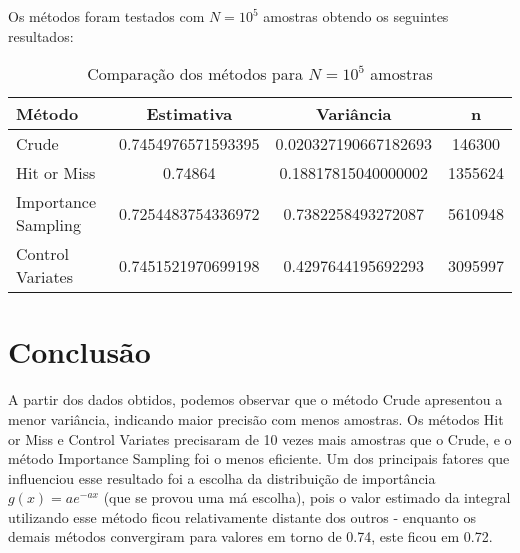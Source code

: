 \documentclass[12pt, a4paper]{article}
\begin{document}
Os métodos foram testados com \( N = 10^5 \) amostras obtendo os seguintes resultados:

\begin{table}[h]
\centering
\caption{Comparação dos métodos para \(N = 10^5\) amostras}
\begin{tabular}{|l|c|c|c|}
\hline
Método & Estimativa & Variância  & n\\ \hline
Crude &   0.7454976571593395 & 0.020327190667182693 & 146300\\ \hline
Hit or Miss & 0.74864 & 0.18817815040000002 & 1355624 \\ \hline
Importance Sampling &  0.7254483754336972 & 0.7382258493272087 & 5610948\\ \hline
Control Variates & 0.7451521970699198 & 0.4297644195692293 & 3095997\\ \hline
\end{tabular}
\end{table}

\section{Conclusão}
\label{sec:conclusao}

A partir dos dados obtidos, podemos observar que o método Crude apresentou a menor variância, indicando maior precisão com menos amostras. Os métodos Hit or Miss e Control Variates precisaram de 10 vezes mais amostras que o Crude, e o método Importance Sampling foi o menos eficiente. Um dos principais fatores que influenciou esse resultado foi a escolha da distribuição de importância \( g(x) = ae^{-ax} \) (que se provou uma má escolha), pois o valor estimado da integral utilizando esse método ficou relativamente distante dos outros - enquanto os demais métodos convergiram para valores em torno de 0.74, este ficou em 0.72.
\end{document}
